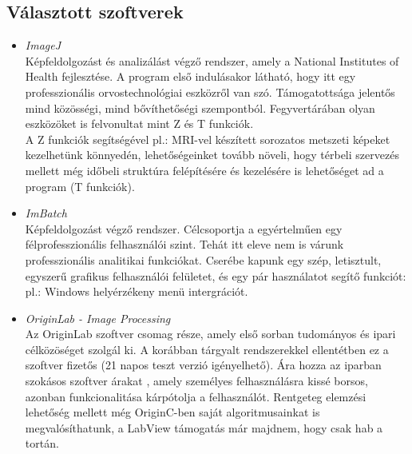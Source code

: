 \documentclass[a4paper,12pt,oneside]{report}
\begin{document}
\subsection{Választott szoftverek}
\begin{itemize}

    \item \emph{ImageJ}\cite{website:imagej}\\
    Képfeldolgozást és analizálást végző rendszer, amely a National Institutes of Health fejlesztése.
	A program első indulásakor látható, hogy itt egy professzionális orvostechnológiai eszközről van szó.
	Támogatottsága jelentős mind közösségi, mind bővíthetőségi szempontból. Fegyvertárában olyan eszközöket is felvonultat mint Z és T funkciók.\cite{article:imagej_article}\\A Z funkciók segítségével pl.: MRI-vel készített sorozatos metszeti képeket kezelhetünk könnyedén, lehetőségeinket tovább növeli, hogy térbeli szervezés mellett még időbeli struktúra felépítésére és kezelésére is lehetőséget ad a program (T funkciók).
    
    \item \emph{ImBatch}\cite{website:imbatch}\\
    Képfeldolgozást végző rendszer. Célcsoportja a egyértelműen egy félprofesszionális felhasználói szint. Tehát itt eleve nem is várunk professzionális analitikai funkciókat. Cserébe kapunk egy szép, letisztult, egyszerű grafikus felhasználói felületet, és egy pár használatot segítő funkciót: pl.: Windows helyérzékeny menü intergrációt.
    
    \item \emph{OriginLab - Image Processing}\cite{website:originlab}\\
	Az OriginLab szoftver csomag része, amely első sorban tudományos és ipari célközöséget szolgál ki. \cite{website:originlab_about} A korábban tárgyalt rendszerekkel ellentétben ez a szoftver fizetős (21 napos teszt verzió igényelhető). Ára hozza az iparban szokásos szoftver árakat \cite{website:originlab_usd}, amely személyes felhasználásra kissé borsos, azonban funkcionalitása kárpótolja a felhasználót. Rentgeteg elemzési lehetőség mellett még OriginC-ben saját algoritmusainkat is megvalósíthatunk, a LabView támogatás már majdnem, hogy csak hab a tortán.\\
\end{itemize}
	
\end{document}

